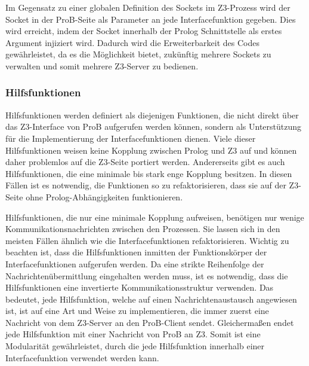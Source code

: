Im Gegensatz zu einer globalen Definition des Sockets im Z3-Prozess wird der Socket in der ProB-Seite als Parameter an jede Interfacefunktion gegeben.
Dies wird erreicht, indem der Socket innerhalb der Prolog Schnittstelle als erstes Argument injiziert wird.
Dadurch wird die Erweiterbarkeit des Codes gewährleistet, da es die Möglichkeit bietet, zukünftig mehrere Sockets zu verwalten und somit mehrere Z3-Server zu bedienen.

\subsubsection{Hilfsfunktionen}
\label{subsec:helper-functions}

Hilfsfunktionen werden definiert als diejenigen Funktionen, die nicht direkt über das Z3-Interface von ProB aufgerufen werden können,
sondern als Unterstützung für die Implementierung der Interfacefunktionen dienen.
Viele dieser Hilfsfunktionen weisen keine Kopplung zwischen Prolog und Z3 auf und können daher problemlos auf die Z3-Seite portiert werden.
Andererseits gibt es auch Hilfsfunktionen, die eine minimale bis stark enge Kopplung besitzen.
In diesen Fällen ist es notwendig, die Funktionen so zu refaktorisieren, dass sie auf der Z3-Seite ohne Prolog-Abhängigkeiten funktionieren.

Hilfsfunktionen, die nur eine minimale Kopplung aufweisen, benötigen nur wenige Kommunikationsnachrichten zwischen den Prozessen.
Sie lassen sich in den meisten Fällen ähnlich wie die Interfacefunktionen refaktorisieren.
Wichtig zu beachten ist, dass die Hilfsfunktionen inmitten der Funktionskörper der Interfacefunktionen aufgerufen werden.
Da eine strikte Reihenfolge der Nachrichtenübermittlung eingehalten werden muss, ist es notwendig, dass die Hilfsfunktionen
eine invertierte Kommunikationsstruktur verwenden.
Das bedeutet, jede Hilfsfunktion, welche auf einen Nachrichtenaustausch angewiesen ist, ist auf eine Art und Weise zu implementieren,
die immer zuerst eine Nachricht von dem Z3-Server an den ProB-Client sendet.
Gleichermaßen endet jede Hilfsfunktion mit einer Nachricht von ProB an Z3.
Somit ist eine Modularität gewährleistet, durch die jede Hilfsfunktion innerhalb einer Interfacefunktion verwendet werden kann.


